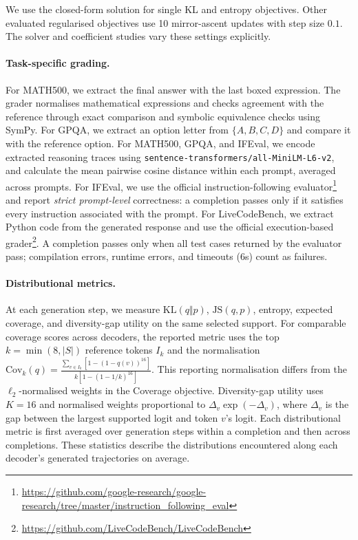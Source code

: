 \documentclass{article} %
\begin{document}
We use the closed-form solution for single KL and entropy objectives. Other evaluated regularised objectives use 10 mirror-ascent updates with step size $0.1$. The solver and coefficient studies vary these settings explicitly.

\paragraph{Task-specific grading.} For MATH500, we extract the final answer with the last boxed expression. The grader normalises mathematical expressions and checks agreement with the reference through exact comparison and symbolic equivalence checks using SymPy. For GPQA, we extract an option letter from $\{A,B,C,D\}$ and compare it with the reference option. 
For MATH500, GPQA, and IFEval, we encode extracted reasoning traces using
\texttt{sentence-transformers/all-MiniLM-L6-v2}, and calculate the mean pairwise cosine distance within each prompt, averaged across prompts. For IFEval, we use the official instruction-following evaluator\footnote{\url{https://github.com/google-research/google-research/tree/master/instruction_following_eval}} and report \emph{strict prompt-level} correctness: a completion passes only if it satisfies every instruction associated with the prompt. For LiveCodeBench, we extract Python code from the generated response and use the official execution-based grader\footnote{\url{https://github.com/LiveCodeBench/LiveCodeBench}}. A completion passes only when all test cases returned by the evaluator pass; compilation errors, runtime errors, and timeouts (6s) count as failures. 


\paragraph{Distributional metrics.}
At each generation step, we measure $\mathrm{KL}(q\Vert p)$, $\mathrm{JS}(q,p)$, entropy, expected coverage, and diversity-gap utility on the same selected support. For comparable coverage scores across decoders, the reported metric uses the top $k=\min(8,|S|)$ reference tokens $I_k$ and the normalisation $\mathrm{Cov}_{k}(q) =\frac{\sum_{v\in I_k}\left[1-(1-q(v))^{16}\right]}{k\left[1-(1-1/k)^{16}\right]}$. This reporting normalisation differs from the $\ell_2$-normalised weights in the Coverage objective. Diversity-gap utility uses $K=16$ and normalised weights proportional to $\Delta_v\exp(-\Delta_v)$, where $\Delta_v$ is the gap between the largest supported logit and token $v$'s logit. Each distributional metric is first averaged over generation steps within a completion and then across completions. These statistics describe the distributions encountered along each decoder's generated trajectories on average.
\end{document}
